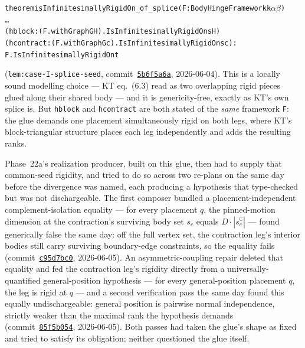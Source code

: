 \begin{alltt}
theorem isInfinitesimallyRigidOn_of_splice (F : BodyHingeFramework k \(\alpha\) \(\beta\))
    \dots
    (hblock : (F.withGraph GH).IsInfinitesimallyRigidOn sH)
    (hcontract : (F.withGraph Gc).IsInfinitesimallyRigidOn sc) :
    F.IsInfinitesimallyRigidOn t
\end{alltt}
(\texttt{lem:case-I-splice-seed},
commit~\href{https://github.com/bryangingechen/CombinatorialRigidity/commit/5b6f5a6a63a7c14d8137e7987bda6d6a744c7814}{\texttt{5b6f5a6a}},
2026-06-04). This is a locally sound modelling choice --- KT eq.~(6.3) read
as two overlapping rigid pieces glued along their shared body --- and it is
genericity-free, exactly as KT's own splice is. But \texttt{hblock} and
\texttt{hcontract} are both stated of the \emph{same} framework \texttt{F}:
the glue demands one placement simultaneously rigid on both legs, where KT's
block-triangular structure places each leg independently and adds the
resulting ranks.

Phase~22a's realization producer, built on this glue, then had to supply
that common-seed rigidity, and tried to do so across two re-plans on the
same day before the divergence was named, each producing a hypothesis that
type-checked but was not dischargeable. The first composer bundled a
placement-independent
complement-isolation equality --- for every placement $q$, the pinned-motion
dimension at the contraction's surviving body set $s_c$ equals $D \cdot
|s_c^{\complement}|$ --- found generically false the same day: off the full
vertex set, the contraction leg's interior bodies still carry surviving
boundary-edge constraints, so the equality fails
(commit~\href{https://github.com/bryangingechen/CombinatorialRigidity/commit/c95d7bc09f1a2125ae4cd11eeb33d7c33bcdfefc}{\texttt{c95d7bc0}},
2026-06-05). An asymmetric-coupling repair deleted that equality and fed the
contraction leg's rigidity directly from a universally-quantified
general-position hypothesis --- for every general-position placement $q$,
the leg is rigid at $q$ --- and a second verification pass the same day
found this equally undischargeable: general position is pairwise normal
independence, strictly weaker than the maximal rank the hypothesis demands
(commit~\href{https://github.com/bryangingechen/CombinatorialRigidity/commit/85f5b0540faad20070bbc2219edcb5fa21721924}{\texttt{85f5b054}},
2026-06-05). Both passes had taken the glue's shape as fixed and tried to
satisfy its obligation; neither questioned the glue itself.


